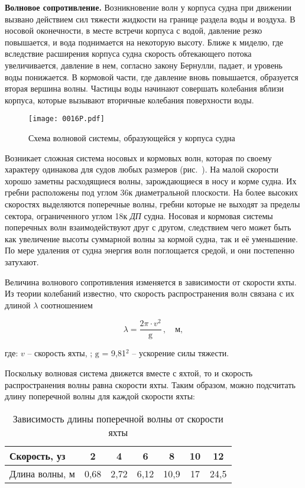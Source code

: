\textbf{Волновое сопротивление.}
Возникновение волн у корпуса судна при движении вызвано действием сил
тяжести жидкости на границе раздела воды и воздуха. В носовой
оконечности, в месте встречи корпуса с водой, давление резко
повышается, и вода поднимается на некоторую высоту. Ближе к миделю,
где вследствие расширения корпуса судна скорость обтекающего потока
увеличивается, давление в нем, согласно закону Бернулли, падает, и
уровень воды понижается. В кормовой части, где давление вновь
повышается, образуется вторая вершина волны. Частицы воды начинают
совершать колебания вблизи корпуса, которые вызывают вторичные
колебания поверхности воды.

\begin{figure*}[htb]
  \centering
  \texttt{[image: 0016P.pdf]}
  \caption{Схема волновой системы, образующейся у корпуса судна}
  \label{fig:16}
\end{figure*}

Возникает сложная система носовых и кормовых волн, которая по своему
характеру одинакова для судов любых размеров (рис.~). На малой
скорости хорошо заметны расходящиеся волны, зарождающиеся в носу и
корме судна. Их гребни расположены под углом 36\gr к
диаметральной плоскости. На более высоких скоростях выделяются
поперечные волны, гребни которые не выходят за пределы сектора,
ограниченного углом 18\gr к \textit{ДП} судна. Носовая и
кормовая системы поперечных волн взаимодействуют друг с другом,
следствием чего может быть как увеличение высоты суммарной волны за
кормой судна, так и её уменьшение. По мере удаления от судна энергия
волн поглощается средой, и они постепенно затухают.

Величина волнового сопротивления изменяется в зависимости от скорости
яхты. Из теории колебаний известно, что скорость распространения волн
связана с их длиной $\lambda$ соотношением

\begin{equation}
  \lambda = \frac{2 \pi \cdot v^2}{\mathrm g}\,, \quad \text{м},
\end{equation}

где: $v$ \--- скорость яхты, \speedms; $\mathrm g$ = 9,81\speedms$^2$ \--- ускорение силы тяжести. 

Поскольку волновая система движется вместе с яхтой, то и скорость
распространения волны равна скорости яхты. Таким образом, можно
подсчитать длину поперечной волны для каждой скорости яхты:

\begin{table*}[htb]
  \small
  \centering
  \begin{tabular}{l|c|c|c|c|c|c}
    \toprule
    Скорость, уз & 2 & 4 & 6 & 8 & 10 & 12 \\
    \midrule
    Длина волны, м & 0,68 & 2,72 & 6,12 & 10,9 & 17 & 24,5 \\
    \bottomrule
  \end{tabular}
  \caption{Зависимость длины поперечной волны от скорости яхты}
  \label{tab:1-2}
\end{table*}

